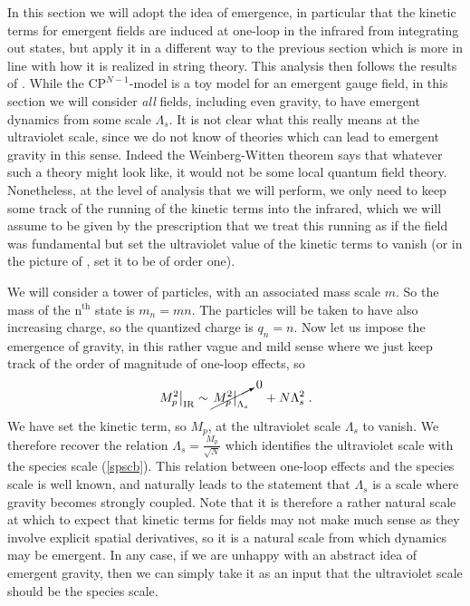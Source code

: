 \documentclass[11pt,a4paper]{article}
\numberwithin{equation}{section}
\numberwithin{table}{section}\setlength{\multlinegap}{25pt}
\newcommand{\be}{\begin{equation}}
\newcommand{\ee}{\end{equation}}
\begin{document}
{In this section we will adopt the idea of emergence, in particular that the kinetic terms for emergent fields are induced at one-loop in the infrared from integrating out states, but apply it in a different way to the previous section which is more in line with how it is realized in string theory. This analysis then follows the results of \cite{Heidenreich:2017sim,Grimm:2018ohb,Heidenreich:2018kpg,Corvilain:2018lgw}. While the $\mathrm{CP}^{N-1}$-model is a toy model for an emergent gauge field, in this section we will consider {\it all} fields, including even gravity, to have emergent dynamics from some scale $\Lambda_s$. It is not clear what this really means at the ultraviolet scale, since we do not know of theories which can lead to emergent gravity in this sense. Indeed the Weinberg-Witten theorem \cite{WEINBERG198059} says that whatever such a theory might look like, it would not be some local quantum field theory. Nonetheless, at the level of analysis that we will perform, we only need to keep some track of the running of the kinetic terms into the infrared, which we will assume to be given by the prescription that we treat this running as if the field was fundamental but set the ultraviolet value of the kinetic terms to vanish (or in the picture of \cite{Heidenreich:2017sim,Heidenreich:2018kpg}, set it to be of order one).

We will consider a tower of particles, with an associated mass scale $m$. So the mass of the $\mathrm{n}^{\mathrm{th}}$ state is $m_n = m n$. The particles will be taken to have also increasing charge, so the quantized charge is $q_n = n$. Now let us impose the emergence of gravity, in this rather vague and mild sense where we just keep track of the order of magnitude of one-loop effects, so
\be
\left. M^2_p \right|_{\mathrm{IR}} \sim \cancelto{0}{\left. M^2_p \right|_{\Lambda_s}} \;\;\;\; + N \Lambda_s^2 \;.
\ee
We have set the kinetic term, so $M_p$, at the ultraviolet scale $\Lambda_s$ to vanish. We therefore recover the relation $\Lambda_s = \frac{M_p}{\sqrt{N}}$ which identifies the ultraviolet scale with the species scale (\ref{spscb}). This relation between one-loop effects and the species scale is well known, and naturally leads to the statement that $\Lambda_s$ is a scale where gravity becomes strongly coupled. Note that it is therefore a rather natural scale at which to expect that kinetic terms for fields may not make much sense as they involve explicit spatial derivatives, so it is a natural scale from which dynamics may be emergent. In any case, if we are unhappy with an abstract idea of emergent gravity, then we can simply take it as an input that the ultraviolet scale should be the species scale. 

}
\end{document}

